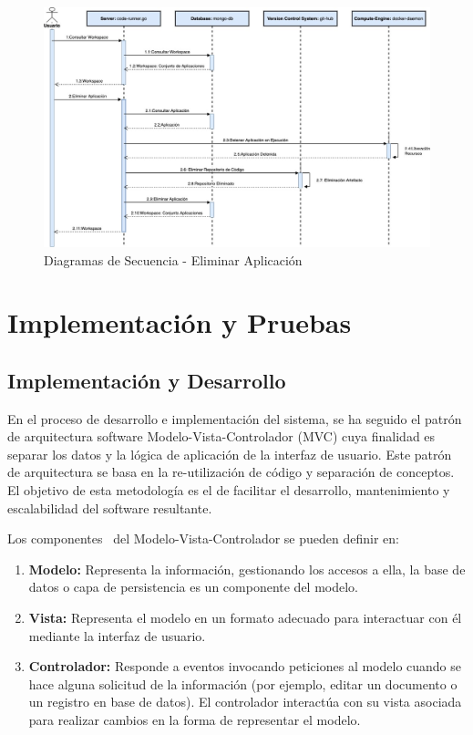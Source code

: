 \documentclass[a4paper,11pt]{book}
\begin{document}
\begin{figure}[H]
\centering
\includegraphics[scale=0.43]{imagenes/secuencia4.jpg}
\caption{ Diagramas de Secuencia - Eliminar Aplicación~\cite{diagrama}  }
\label{s4}
\end{figure}


\chapter{ Implementación y Pruebas}

\section{Implementación y Desarrollo}\label{secid}
En el proceso de desarrollo e implementación del sistema, se ha seguido el patrón de arquitectura software Modelo-Vista-Controlador (MVC) cuya finalidad es separar los datos y la lógica de aplicación de la interfaz de usuario. Este patrón de arquitectura se basa en la re-utilización de código y separación de conceptos. El objetivo de esta metodología es el de facilitar el desarrollo, mantenimiento y escalabilidad del software resultante.


Los componentes~\cite{mvc3} del Modelo-Vista-Controlador se pueden definir en:

\begin{enumerate}
\item \textbf{Modelo:} Representa la información, gestionando los accesos a ella, la base de datos  o capa de persistencia es un componente del modelo.

\item \textbf{Vista:} Representa el modelo en un formato adecuado para interactuar con él mediante la interfaz de usuario.

\item \textbf{Controlador:} Responde a eventos invocando peticiones al modelo cuando se hace alguna solicitud de la información (por ejemplo, editar un documento o un registro en base de datos). El controlador interactúa con su vista asociada para realizar cambios en la forma de representar el modelo.
\end{enumerate}
\end{document}
